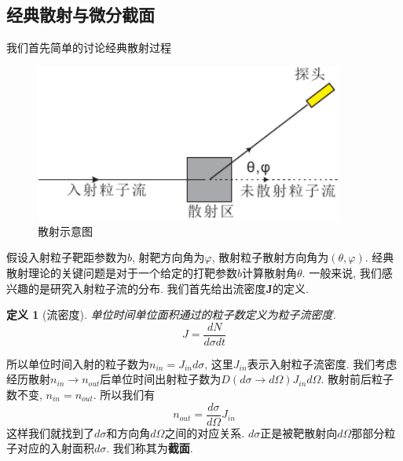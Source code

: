 \documentclass[a4paper,11pt]{book}
\newtheorem{definition}{\hspace{2em}定义}[section]
\begin{document}
\subsection{经典散射与微分截面}
我们首先简单的讨论经典散射过程
\begin{figure}[H]
  \centering
  \includegraphics[width=4in]{scatterfig1.pdf}
  \caption{散射示意图}\label{scatterfig1}
\end{figure}
假设入射粒子靶距参数为$b$, 射靶方向角为$\varphi$, 散射粒子散射方向角为$(\theta,\varphi)$. 经典散射理论的关键问题是对于一个给定的打靶参数$b$计算散射角$\theta$. 一般来说, 我们感兴趣的是研究入射粒子流的分布. 我们首先给出流密度$\mathbf{J}$的定义.
\begin{definition}[流密度]
  单位时间单位面积通过的粒子数定义为粒子流密度.
  \begin{equation}
    J=\frac{dN}{d\sigma dt}
  \end{equation}
\end{definition}
所以单位时间入射的粒子数为$n_{in}=J_{in}d\sigma$, 这里$J_{in}$表示入射粒子流密度. 我们考虑经历散射$n_{in}\rightarrow n_{out}$后单位时间出射粒子数为$D(d\sigma\rightarrow d\Omega)J_{in}d\Omega$. 散射前后粒子数不变, $n_{in}=n_{out}$. 所以我们有
\begin{equation}
  n_{out}=\frac{d\sigma}{d\Omega}J_{in}
\end{equation}
这样我们就找到了$d\sigma$和方向角$d\Omega$之间的对应关系. $d\sigma$正是被靶散射向$d\Omega$那部分粒子对应的入射面积$d\sigma$. 我们称其为\textbf{截面}.
\end{document}

